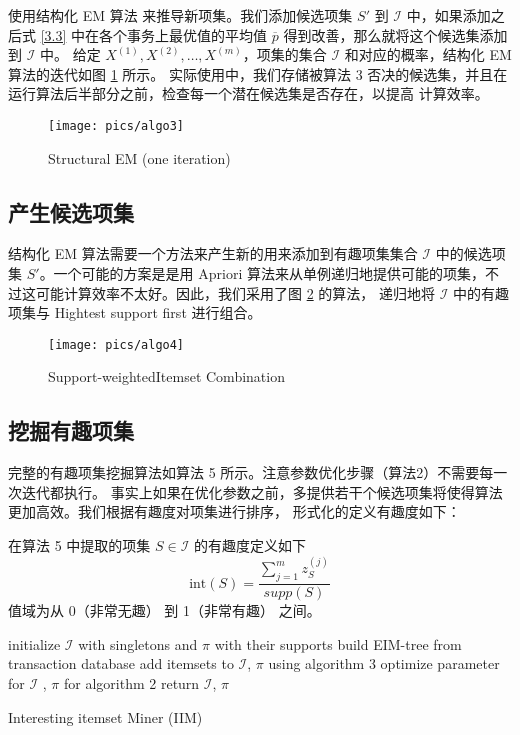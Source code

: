 \documentclass{ctexart}
\newcommand{\scri}[0]{\mathcal{I}}
\begin{document}
使用结构化 EM 算法 \cite{friedman} 来推导新项集。我们添加候选项集 $S'$ 到 $\scri$ 中，如果添加之后式 \ref{3.3}
中在各个事务上最优值的平均值 $\overline{p}$ 得到改善，那么就将这个候选集添加到 $\scri$ 中。
给定 $X^{(1)}, X^{(2)}, \dots, X^{(m)}$，项集的集合 $\scri$ 和对应的概率，结构化 EM 算法的迭代如图 \ref{fig:algo3} 所示。
实际使用中，我们存储被算法 3 否决的候选集，并且在运行算法后半部分之前，检查每一个潜在候选集是否存在，以提高
计算效率。

\begin{figure}
	\centering
	\texttt{[image: pics/algo3]}
	\caption{Structural EM (one iteration)}
	\label{fig:algo3}
\end{figure}

\subsection{产生候选项集}
结构化 EM 算法需要一个方法来产生新的用来添加到有趣项集集合 $\scri$ 中的候选项集 $S'$。一个可能的方案是是用
Apriori 算法来从单例递归地提供可能的项集，不过这可能计算效率不太好。因此，我们采用了图 \ref{fig:algo4} 的算法，
递归地将 $\scri$ 中的有趣项集与 Hightest support first 进行组合。

\begin{figure}
	\centering
	\texttt{[image: pics/algo4]}
	\caption{Support-weightedItemset Combination}
	\label{fig:algo4}
\end{figure}

\subsection{挖掘有趣项集}

完整的有趣项集挖掘算法如算法 5 所示。注意参数优化步骤（算法2）不需要每一次迭代都执行。
事实上如果在优化参数之前，多提供若干个候选项集将使得算法更加高效。我们根据有趣度对项集进行排序，
形式化的定义有趣度如下：

在算法 5 中提取的项集 $S \in \scri$ 的有趣度定义如下
$$
\mathrm{int}(S) = \frac { \sum_{j=1}^{m} z_S^{(j)} }{ supp(S) }
$$
值域为从 0（非常无趣） 到 1（非常有趣） 之间。

\begin{algorithm}[H]
	initialize $\scri$ with singletons and $\pi$ with their supports \;
	build EIM-tree from transaction database \;
	 {
		add itemsets to $\scri$, $\pi$ using algorithm 3 \;
		optimize parameter for $\scri$ , $\pi$ for algorithm 2 \;
	}
	return $\scri$, $\pi$ \;
	\label{algo5}
	\caption{Interesting itemset Miner (IIM)}
\end{algorithm}
\end{document}
